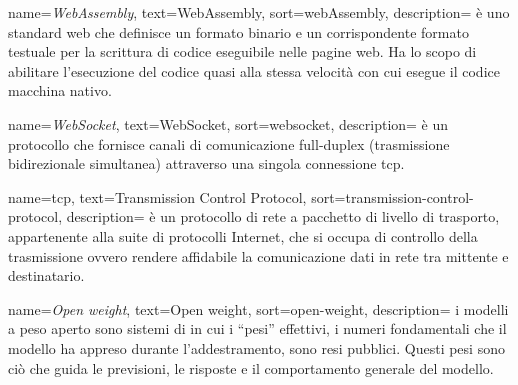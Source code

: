  {
    name=\textit{WebAssembly},
    text=WebAssembly,
    sort=webAssembly,
    description={ è uno standard web che definisce un formato binario e un corrispondente formato testuale per la scrittura di codice eseguibile nelle pagine web. Ha lo scopo di abilitare l'esecuzione del codice quasi alla stessa velocità con cui esegue il codice macchina nativo. \\
    \cite{site:webassembly-wiki}
    }
}

 {
    name=\textit{WebSocket},
    text=WebSocket,
    sort=websocket,
    description={ è un protocollo che fornisce canali di comunicazione full-duplex (trasmissione bidirezionale simultanea) attraverso una singola connessione \acrshort{tcp}. \\
    \cite{site:websocket-wiki}
    }
}

 {
    name=\acrshort{tcp},
    text=Transmission Control Protocol,
    sort=transmission-control-protocol,
    description={ è un protocollo di rete a pacchetto di livello di trasporto, appartenente alla suite di protocolli Internet, che si occupa di controllo della trasmissione ovvero rendere affidabile la comunicazione dati in rete tra mittente e destinatario. \\
    \cite{site:tcp-wiki}
    }
}

 {
    name=\textit{Open weight},
    text=Open weight,
    sort=open-weight,
    description={ i modelli a peso aperto sono sistemi di  in cui i “pesi” effettivi, i numeri fondamentali che il modello ha appreso durante l’addestramento, sono resi pubblici. Questi pesi sono ciò che guida le previsioni, le risposte e il comportamento generale del modello. \\
    \cite{site:open_weight-invezz}
    }
}